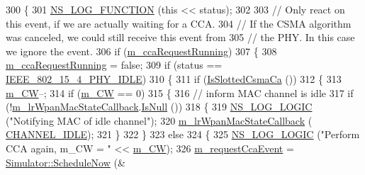 \begin{DoxyCode}
300 \{
301   \hyperlink{log-macros-disabled_8h_a90b90d5bad1f39cb1b64923ea94c0761}{NS\_LOG\_FUNCTION} (\textcolor{keyword}{this} << status);
302 
303   \textcolor{comment}{// Only react on this event, if we are actually waiting for a CCA.}
304   \textcolor{comment}{// If the CSMA algorithm was canceled, we could still receive this event from}
305   \textcolor{comment}{// the PHY. In this case we ignore the event.}
306   \textcolor{keywordflow}{if} (\hyperlink{classns3_1_1LrWpanCsmaCa_ac340966d433ad1f4e8e47a4fea322b4e}{m\_ccaRequestRunning})
307     \{
308       \hyperlink{classns3_1_1LrWpanCsmaCa_ac340966d433ad1f4e8e47a4fea322b4e}{m\_ccaRequestRunning} = \textcolor{keyword}{false};
309       \textcolor{keywordflow}{if} (status == \hyperlink{group__lr-wpan_gga6494269d13d45c511a07b7ccbb1de754af3994414efcd2fac7e312ecb9b3ebd70}{IEEE\_802\_15\_4\_PHY\_IDLE})
310         \{
311           \textcolor{keywordflow}{if} (\hyperlink{classns3_1_1LrWpanCsmaCa_accda524ef6c8f9ab6c54aff18e78c17a}{IsSlottedCsmaCa} ())
312             \{
313               \hyperlink{classns3_1_1LrWpanCsmaCa_a8d023ec83ebdeafe0a89602b8185e357}{m\_CW}--;
314               \textcolor{keywordflow}{if} (\hyperlink{classns3_1_1LrWpanCsmaCa_a8d023ec83ebdeafe0a89602b8185e357}{m\_CW} == 0)
315                 \{
316                   \textcolor{comment}{// inform MAC channel is idle}
317                   \textcolor{keywordflow}{if} (!\hyperlink{classns3_1_1LrWpanCsmaCa_a5204cf0e1f945663d73892148abcbfc0}{m\_lrWpanMacStateCallback}.\hyperlink{classns3_1_1Callback_aa8e27826badbf37f84763f36f70d9b54}{IsNull} ())
318                     \{
319                       \hyperlink{group__logging_ga88acd260151caf2db9c0fc84997f45ce}{NS\_LOG\_LOGIC} (\textcolor{stringliteral}{"Notifying MAC of idle channel"});
320                       \hyperlink{classns3_1_1LrWpanCsmaCa_a5204cf0e1f945663d73892148abcbfc0}{m\_lrWpanMacStateCallback} (
      \hyperlink{group__lr-wpan_gga02ee7efd682937a8781f5e6101f61884a5fc914e9b7a8670e354de67fd9c433e8}{CHANNEL\_IDLE});
321                     \}
322                 \}
323               \textcolor{keywordflow}{else}
324                 \{
325                   \hyperlink{group__logging_ga88acd260151caf2db9c0fc84997f45ce}{NS\_LOG\_LOGIC} (\textcolor{stringliteral}{"Perform CCA again, m\_CW = "} << \hyperlink{classns3_1_1LrWpanCsmaCa_a8d023ec83ebdeafe0a89602b8185e357}{m\_CW});
326                   \hyperlink{classns3_1_1LrWpanCsmaCa_a6a215728f302ffbcfe97f8d560f37780}{m\_requestCcaEvent} = \hyperlink{classns3_1_1Simulator_a2219ee02c0647adc83d1c918c3256266}{Simulator::ScheduleNow} (&

\end{DoxyCode}
